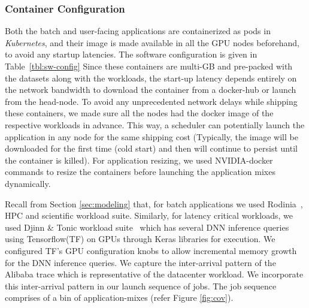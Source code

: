 \subsubsection{Container Configuration}

Both the batch and user-facing applications are containerized as pods in \textit{Kubernetes}, and their image is made available in all the GPU nodes beforehand, to avoid any startup latencies. The software configuration is given in Table~\ref{tbl:sw-config} Since these containers are multi-GB and pre-packed with the datasets along with the workloads, the start-up latency depends entirely on the network bandwidth to download the container from a docker-hub or launch from the head-node. To avoid any unprecedented network delays while shipping these containers, we made sure all the nodes had the docker image of the respective workloads in advance. This way, a scheduler can potentially launch the application in any node for the same shipping cost (Typically, the image will be downloaded for the first time (cold start) and then will continue to persist until the container is killed). For application resizing, we used NVIDIA-docker commands to resize the containers before launching the application mixes dynamically. 

Recall from Section \ref{sec:modeling} that, for batch applications we used Rodinia~\cite{che2009rodinia}, HPC and scientific workload suite. Similarly, for latency critical workloads, we used Djinn \& Tonic workload suite~\cite{hauswald2015djinn} which has several DNN inference queries using Tensorflow(TF) on GPUs through Keras libraries for execution. We configured TF's GPU configuration knobs to allow incremental memory growth for the DNN inference queries.  We capture the inter-arrival pattern of the Alibaba trace which is representative of the datacenter workload. We incorporate this inter-arrival pattern in our launch sequence of jobs. The  job sequence comprises of a bin of application-mixes (refer Figure \ref{fig:cov}). 
 






